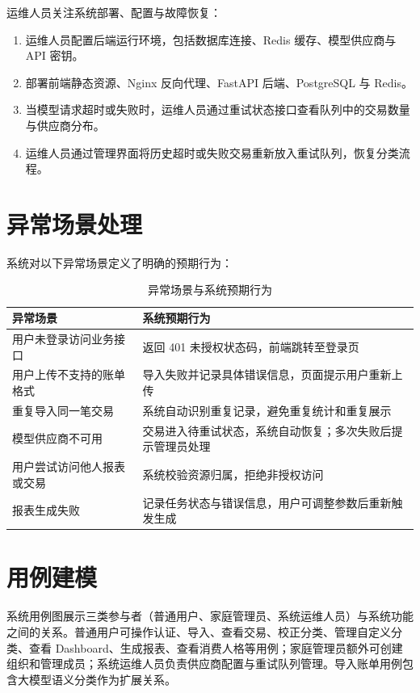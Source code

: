 运维人员关注系统部署、配置与故障恢复：

\begin{enumerate}
  \item 运维人员配置后端运行环境，包括数据库连接、Redis 缓存、模型供应商与 API 密钥。
  \item 部署前端静态资源、Nginx 反向代理、FastAPI 后端、PostgreSQL 与 Redis。
  \item 当模型请求超时或失败时，运维人员通过重试状态接口查看队列中的交易数量与供应商分布。
  \item 运维人员通过管理界面将历史超时或失败交易重新放入重试队列，恢复分类流程。
\end{enumerate}

\section{异常场景处理}

系统对以下异常场景定义了明确的预期行为：

\begin{table}[H]
\centering
\caption{异常场景与系统预期行为}
\label{tab:exception-scenarios}
\begin{tabular}{p{4.8cm} p{8.5cm}}
\toprule
\textbf{异常场景} & \textbf{系统预期行为} \\
\midrule
用户未登录访问业务接口 & 返回 401 未授权状态码，前端跳转至登录页 \\
\hline
用户上传不支持的账单格式 & 导入失败并记录具体错误信息，页面提示用户重新上传 \\
\hline
重复导入同一笔交易 & 系统自动识别重复记录，避免重复统计和重复展示 \\
\hline
模型供应商不可用 & 交易进入待重试状态，系统自动恢复；多次失败后提示管理员处理 \\
\hline
用户尝试访问他人报表或交易 & 系统校验资源归属，拒绝非授权访问 \\
\hline
报表生成失败 & 记录任务状态与错误信息，用户可调整参数后重新触发生成 \\
\bottomrule
\end{tabular}
\end{table}

\section{用例建模}

系统用例图展示三类参与者（普通用户、家庭管理员、系统运维人员）与系统功能之间的关系。普通用户可操作认证、导入、查看交易、校正分类、管理自定义分类、查看 Dashboard、生成报表、查看消费人格等用例；家庭管理员额外可创建组织和管理成员；系统运维人员负责供应商配置与重试队列管理。导入账单用例包含大模型语义分类作为扩展关系。

